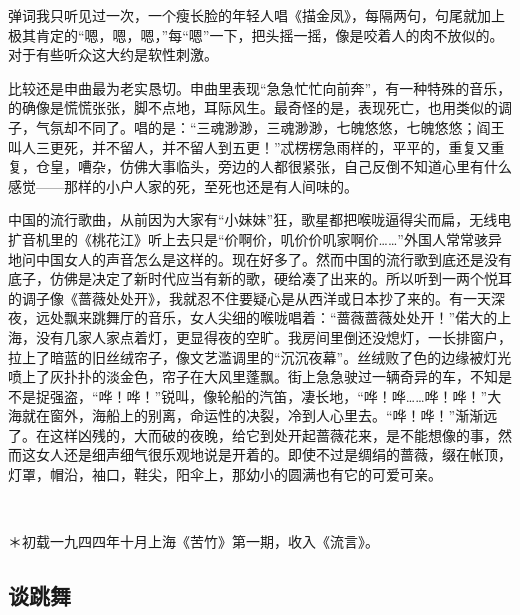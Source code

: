 \par 弹词我只听见过一次，一个瘦长脸的年轻人唱《描金凤》，每隔两句，句尾就加上极其肯定的“嗯，嗯，嗯，”每“嗯”一下，把头摇一摇，像是咬着人的肉不放似的。对于有些听众这大约是软性刺激。
\par 比较还是申曲最为老实恳切。申曲里表现“急急忙忙向前奔”，有一种特殊的音乐，的确像是慌慌张张，脚不点地，耳际风生。最奇怪的是，表现死亡，也用类似的调子，气氛却不同了。唱的是：“三魂渺渺，三魂渺渺，七魄悠悠，七魄悠悠；阎王叫人三更死，并不留人，并不留人到五更！”忒楞楞急雨样的，平平的，重复又重复，仓皇，嘈杂，仿佛大事临头，旁边的人都很紧张，自己反倒不知道心里有什么感觉——那样的小户人家的死，至死也还是有人间味的。
\par 中国的流行歌曲，从前因为大家有“小妹妹”狂，歌星都把喉咙逼得尖而扁，无线电扩音机里的《桃花江》听上去只是“价啊价，叽价价叽家啊价……”外国人常常骇异地问中国女人的声音怎么是这样的。现在好多了。然而中国的流行歌到底还是没有底子，仿佛是决定了新时代应当有新的歌，硬给凑了出来的。所以听到一两个悦耳的调子像《蔷薇处处开》，我就忍不住要疑心是从西洋或日本抄了来的。有一天深夜，远处飘来跳舞厅的音乐，女人尖细的喉咙唱着：“蔷薇蔷薇处处开！”偌大的上海，没有几家人家点着灯，更显得夜的空旷。我房间里倒还没熄灯，一长排窗户，拉上了暗蓝的旧丝绒帘子，像文艺滥调里的“沉沉夜幕”。丝绒败了色的边缘被灯光喷上了灰扑扑的淡金色，帘子在大风里蓬飘。街上急急驶过一辆奇异的车，不知是不是捉强盗，“哗！哗！”锐叫，像轮船的汽笛，凄长地，“哗！哗……哗！哗！”大海就在窗外，海船上的别离，命运性的决裂，冷到人心里去。“哗！哗！”渐渐远了。在这样凶残的，大而破的夜晚，给它到处开起蔷薇花来，是不能想像的事，然而这女人还是细声细气很乐观地说是开着的。即使不过是绸绢的蔷薇，缀在帐顶，灯罩，帽沿，袖口，鞋尖，阳伞上，那幼小的圆满也有它的可爱可亲。
\par  
\par ＊初载一九四四年十月上海《苦竹》第一期，收入《流言》。


\subsection{谈跳舞}

